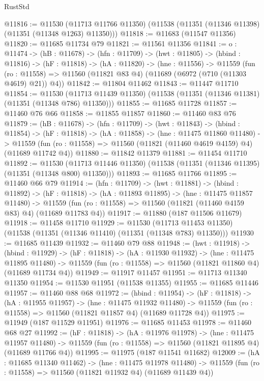 \begin{lexlean}{RustStd}
\begin{coremodule}
@11816 := @11530
    (@11713 @11766 @11350)
    (@11538 (@11351 (@11346 @11398) (@11351 (@11348 @1263) @11350)))
@11818 := @11683 (@11547 @11356)
@11820 := @11685 @11734 @79
@11821 := @11561 @11356
@11841 := {o : @11474} ->
  (hB : @11678) ->
  (hfn : @11709) ->
  (hwt : @11805) ->
  (hbind : @11816) ->
  (hF : @11818) ->
  (hA : @11820) ->
  (hne : @11556) ->
  @11559 (fun (ro : @11558) => @11560 (@11821 @83 @4) (@11689 (@6972 (@710 (@11303 @4619) @21)) @4))
@11842 := @11804 @11462
@11843 := @11447 @11710
@11854 := @11530
    (@11713 @11439 @11350)
    (@11538 (@11351 (@11346 @11381) (@11351 (@11348 @786) @11350)))
@11855 := @11685 @11728
@11857 := @11460 @76 @66
@11858 := @11855 @11857
@11860 := @11460 @83 @76
@11879 := (hB : @11678) ->
  (hfn : @11709) ->
  (hwt : @11843) ->
  (hbind : @11854) ->
  (hF : @11818) ->
  (hA : @11858) ->
  (hne : @11475 @11860 @11480) ->
  @11559 (fun (ro : @11558) => @11560 (@11821 (@11460 @4619 @4159) @4) (@11689 @11742 @4))
@11880 := @11842 @11379
@11881 := @11454 @11710
@11892 := @11530
    (@11713 @11446 @11350)
    (@11538 (@11351 (@11346 @11395) (@11351 (@11348 @800) @11350)))
@11893 := @11685 @11766
@11895 := @11460 @66 @79
@11914 := (hfn : @11709) ->
  (hwt : @11881) ->
  (hbind : @11892) ->
  (hF : @11818) ->
  (hA : @11893 @11895) ->
  (hne : @11475 @11857 @11480) ->
  @11559 (fun (ro : @11558) => @11560 (@11821 (@11460 @4159 @83) @4) (@11689 @11783 @4))
@11917 := @11880 (@187 @11506 @11679)
@11918 := @11458 @11710
@11929 := @11530
    (@11713 @11453 @11350)
    (@11538 (@11351 (@11346 @11410) (@11351 (@11348 @783) @11350)))
@11930 := @11685 @11439
@11932 := @11460 @79 @88
@11948 := (hwt : @11918) ->
  (hbind : @11929) ->
  (hF : @11818) ->
  (hA : @11930 @11932) ->
  (hne : @11475 @11895 @11480) ->
  @11559 (fun (ro : @11558) => @11560 (@11821 @11860 @4) (@11689 @11734 @4))
@11949 := @11917 @11457
@11951 := @11713 @11340 @11350
@11954 := @11530 @11951 (@11538 @11355)
@11955 := @11685 @11446
@11957 := @11460 @88 @68
@11972 := (hbind : @11954) ->
  (hF : @11818) ->
  (hA : @11955 @11957) ->
  (hne : @11475 @11932 @11480) ->
  @11559 (fun (ro : @11558) => @11560 (@11821 @11857 @4) (@11689 @11728 @4))
@11975 := @11949 (@187 @11529 @11951)
@11976 := @11685 @11453
@11978 := @11460 @68 @27
@11992 := (hF : @11818) ->
  (hA : @11976 @11978) ->
  (hne : @11475 @11957 @11480) ->
  @11559 (fun (ro : @11558) => @11560 (@11821 @11895 @4) (@11689 @11766 @4))
@11995 := @11975 (@187 @11541 @11682)
@12009 := (hA : @11685 @11340 @11462) ->
  (hne : @11475 @11978 @11480) ->
  @11559 (fun (ro : @11558) => @11560 (@11821 @11932 @4) (@11689 @11439 @4))

\end{coremodule}
\end{lexlean}
